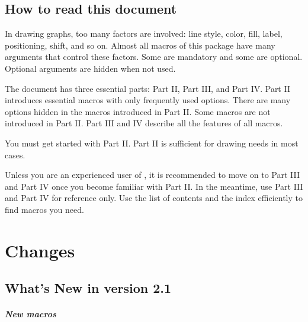 \section{How to read this document}

In drawing graphs, too many factors are involved: line style, color, fill, label, positioning, shift, and so on.
Almost all macros of this package have many arguments that control these factors.
Some are mandatory and some are optional.
Optional arguments are hidden when not used.

The document has three essential parts: Part II, Part III, and Part IV.
Part II introduces essential macros with only frequently used options.
There are many options hidden in the macros introduced in Part II.
Some macros are not introduced in Part II.
Part III and IV describe all the features of all macros.

You must get started with Part II.
Part II is sufficient for drawing needs in most cases.

Unless you are an experienced user of \Tikz, it is recommended to move on to Part III and Part IV once you become familiar with Part II. In the meantime, use Part III and Part IV for reference only. Use the list of contents and the index efficiently to find macros you need.


\chapter{Changes}

\section{What's New in version 2.1}

\paragraph{New macros}

